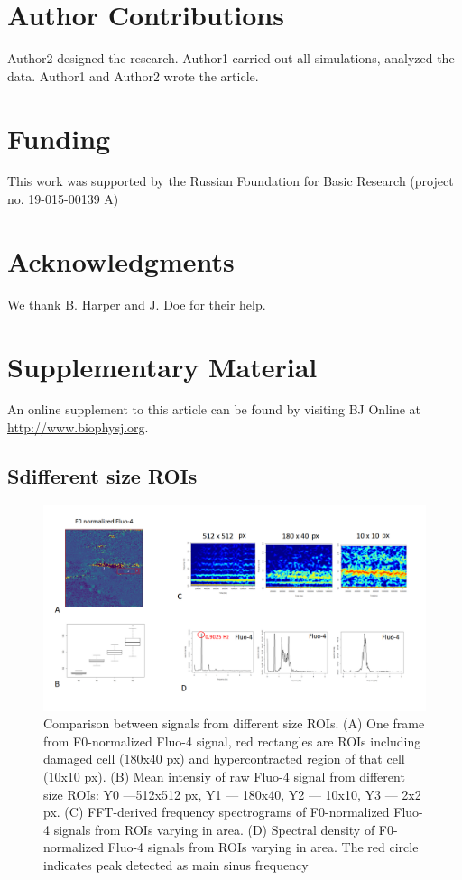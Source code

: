 \documentclass{biophys-new}
\begin{document}
\section*{Author Contributions}
Author2 designed the research. Author1 carried out all simulations, analyzed the data. Author1 and Author2 wrote the article.

\section*{Funding}
This work was supported by the Russian Foundation for Basic Research (project no. 19-015-00139 A)

\section*{Acknowledgments}
We thank B. Harper and J. Doe for their help.




\section*{Supplementary Material}
An online supplement to this article can be found by visiting BJ Online at \url{http://www.biophysj.org}.

\subsection*{Sdifferent size ROIs}

\begin{figure}
    \includegraphics[width=0.9\linewidth]{fig3.png}
    \caption{Comparison between signals from different size ROIs. (A) One frame from F0-normalized Fluo-4 signal, red rectangles are  ROIs including damaged cell (180x40 px) and hypercontracted region of that cell (10x10 px). (B) Mean intensiy of raw Fluo-4 signal from different size ROIs: Y0 ---512x512 px, Y1 --- 180x40, Y2 --- 10x10, Y3 --- 2x2 px. (C) FFT-derived frequency spectrograms of F0-normalized Fluo-4 signals from ROIs varying in area. (D) Spectral density of F0-normalized Fluo-4 signals from ROIs varying in area. The red circle indicates peak detected as main sinus frequency }
    \label{fig:fig3}
\end{figure}
\end{document}
